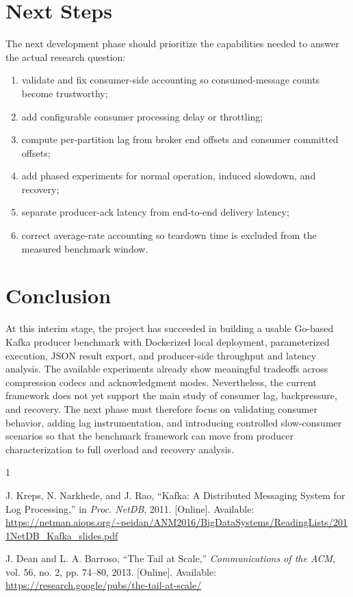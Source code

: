 \documentclass[conference]{IEEEtran}
\begin{document}
\section{Next Steps}
The next development phase should prioritize the capabilities needed to answer the actual research question:

\begin{enumerate}
\item validate and fix consumer-side accounting so consumed-message counts become trustworthy;
\item add configurable consumer processing delay or throttling;
\item compute per-partition lag from broker end offsets and consumer committed offsets;
\item add phased experiments for normal operation, induced slowdown, and recovery;
\item separate producer-ack latency from end-to-end delivery latency;
\item correct average-rate accounting so teardown time is excluded from the measured benchmark window.
\end{enumerate}

\section{Conclusion}
At this interim stage, the project has succeeded in building a usable Go-based Kafka producer benchmark with Dockerized local deployment, parameterized execution, JSON result export, and producer-side throughput and latency analysis. The available experiments already show meaningful tradeoffs across compression codecs and acknowledgment modes. Nevertheless, the current framework does not yet support the main study of consumer lag, backpressure, and recovery. The next phase must therefore focus on validating consumer behavior, adding lag instrumentation, and introducing controlled slow-consumer scenarios so that the benchmark framework can move from producer characterization to full overload and recovery analysis.

\begin{thebibliography}{1}

J. Kreps, N. Narkhede, and J. Rao, ``Kafka: A Distributed Messaging System for Log Processing,'' in \emph{Proc. NetDB}, 2011. [Online]. Available: \url{https://netman.aiops.org/~peidan/ANM2016/BigDataSystems/ReadingLists/2011NetDB_Kafka_slides.pdf}

J. Dean and L. A. Barroso, ``The Tail at Scale,'' \emph{Communications of the ACM}, vol. 56, no. 2, pp. 74--80, 2013. [Online]. Available: \url{https://research.google/pubs/the-tail-at-scale/}

\end{thebibliography}
\end{document}
